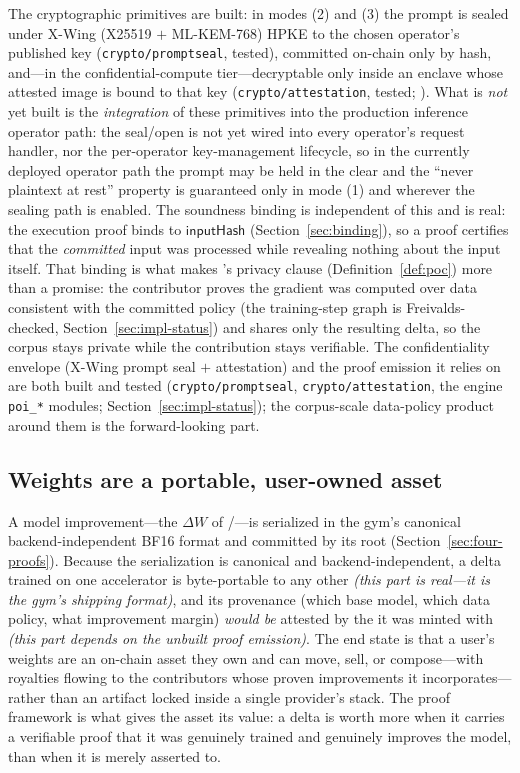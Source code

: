 The cryptographic primitives are built: in modes (2) and (3) the prompt is sealed under
X-Wing (X25519 $+$ ML-KEM-768) HPKE to the chosen operator's published key
(\texttt{crypto/promptseal}, tested), committed on-chain only by hash, and---in the
confidential-compute tier---decryptable only inside an enclave whose attested image is
bound to that key (\texttt{crypto/attestation}, tested; \cite{poiemission}). What is
\emph{not} yet built is the \emph{integration} of these primitives into the production
inference operator path: the seal/open is not yet wired into every operator's request
handler, nor the per-operator key-management lifecycle, so in the currently deployed
operator path the prompt may be held in the clear and the ``never plaintext at rest''
property is guaranteed only in mode (1) and wherever the sealing path is enabled. The
soundness binding is independent of this and is real: the execution proof binds to
$\mathsf{inputHash}$ (Section~\ref{sec:binding}), so a proof certifies that the
\emph{committed} input was processed while revealing nothing about the input itself. That
binding is what makes \PoC{}'s privacy clause (Definition~\ref{def:poc}) more than a
promise: the contributor proves the gradient was computed over data consistent with the
committed policy (the training-step graph is Freivalds-checked,
Section~\ref{sec:impl-status}) and shares only the resulting delta, so the corpus stays
private while the contribution stays verifiable. The confidentiality envelope (X-Wing
prompt seal $+$ attestation) and the proof emission it relies on are both built and tested
(\texttt{crypto/promptseal}, \texttt{crypto/attestation}, the engine \texttt{poi\_*}
modules; Section~\ref{sec:impl-status}); the corpus-scale data-policy product around them
is the forward-looking part.

\subsection{Weights are a portable, user-owned asset}

A model improvement---the $\Delta W$ of \PoT{}/\PoC{}---is serialized in the gym's
canonical backend-independent BF16 format and committed by its root
(Section~\ref{sec:four-proofs}). Because the serialization is canonical and
backend-independent, a delta trained on one accelerator is byte-portable to any other
\emph{(this part is real---it is the gym's shipping format)}, and its provenance (which
base model, which data policy, what improvement margin) \emph{would be}
attested by the \PoC{} it was minted with \emph{(this part depends on the unbuilt proof
emission)}. The end state is that a user's weights are an on-chain
asset they own and can move, sell, or compose---with royalties flowing to the
contributors whose proven improvements it incorporates---rather than an artifact
locked inside a single provider's stack. The proof framework is what gives the asset
its value: a delta is worth more when it carries a verifiable proof that it was
genuinely trained and genuinely improves the model, than when it is merely asserted to.

